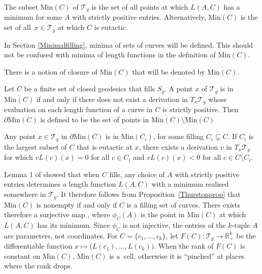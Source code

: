 \begin{Definition}
The subset $\mathrm{Min}(C)$ of $\mathcal{T}_{g}$ is the set of all points at which $L(A,C)$ has a minimum for some $A$ with strictly positive entries. Alternatively, $\mathrm{Min}(C)$ is the set of all~${x\in \mathcal{T}_{g}}$ at which $C$ is eutactic.
\end{Definition}


In Section \ref{Minimalfilling}, minima of sets of curves will be defined. This should not be confused with minima of length functions in the definition of $\mathrm{Min}(C)$.

There is a notion of closure of $\mathrm{Min}(C)$ that will be denoted by $\overline{\mathrm{Min}(C)}$.

\begin{Definition}\label{defnmod}
Let $C$ be a finite set of closed geodesics that fills $S_{g}$. A point $x$ of $\mathcal{T}_{g}$ is in $\overline{\mathrm{Min}(C)}$ if and only if there does not exist a derivation in $T_{x}\mathcal{T}_{g}$ whose evaluation on each length function of a curve in $C$ is strictly positive. Then $\partial \mathrm{Min}(C)$ is defined to be the set of points in $\overline{\mathrm{Min}(C)}\setminus \mathrm{Min}(C)$
\end{Definition}

\begin{Lemma}
\label{lemma14}
Any point $x\in\mathcal{T}_{g}$ in $\partial\mathrm{Min}(C)$ is in $\mathrm{Min}(C_{i})$, for some filling $C_{i}\subsetneq C$. If $C_{i}$ is the largest subset of $C$ that is eutactic at $x$, there exists a derivation $v$ in $T_{x}\mathcal{T}_{g}$ for which $vL(c)(x)=0$ for all $c\in C_{i}$ and $vL(c)(x)<0$ for all $c\in C\setminus C_{i}$.
\end{Lemma}

Lemma 1 of \cite{SchmutzMorse} showed that when $C$ fills, any choice of $A$ with strictly positive entries determines a length function $L(A,C)$ with a minimum realised somewhere in $\mathcal{T}_{g}$. It therefore follows from Proposition~\ref{Thurstonprop} that $\mathrm{Min}(C)$ is nonempty if and only if $C$ is a filling set of curves. There exists therefore a surjective map , where $\phi_{C}(A)$ is the point in $\mathrm{Min}(C)$ at which $L(A,C)$ has its minimum. Since $\phi_{C}$ is not injective, the entries of the $k$-tuple $A$ are parameters, not coordinates. For $C=\{c_{1}, \dots, c_{k}\}$, let $F(C)\colon\mathcal{T}_{g}\rightarrow \mathbb{R}^{k}_{+}$ be the differentiable function $x\mapsto \bigl(L(c_{1}), \dots, L(c_{k})\bigr)$. When the rank of $F(C)$ is constant on $\mathrm{Min}(C)$, $\mathrm{Min}(C)$ is a~cell, otherwise it is ``pinched'' at places where the rank drops.

